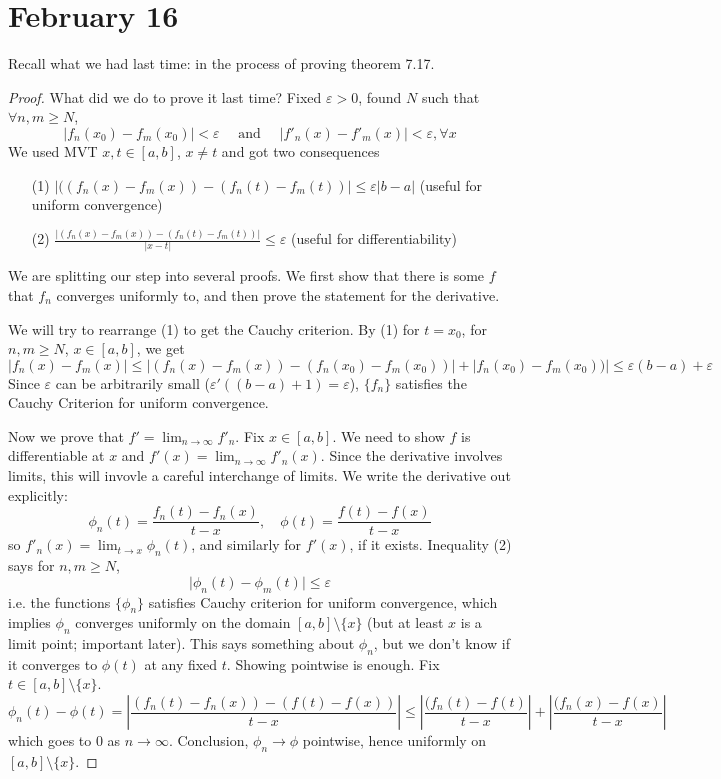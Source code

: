 \documentclass{article}
\theoremstyle{plain}
\theoremstyle{remark}
\newcommand{\ep}{{\varepsilon}}
\begin{document}
\section{February 16}
Recall what we had last time: in the process of proving theorem 7.17.
\begin{proof}
	What did we do to prove it last time?
	Fixed $\ep > 0$, found $N$ such that $\forall n,m \geq N$,
	\[
		\lvert f_n(x_0) - f_m(x_0) \rvert < \ep
		\quad\text{ and }\quad
		\lvert f'_n(x) - f'_m(x)\rvert < \ep, \forall x
	\]
	We used MVT $x,t \in [a,b]$, $x \neq t$ and got two consequences
	\begin{enumerate}
		\item[(1)] $|((f_n(x) - f_m(x)) - (f_n(t) - f_m(t)) | \leq \ep |b-a|$
			(useful for uniform convergence)
		\item[(2)] $\frac{|(f_n(x) - f_m(x)) - (f_n(t) - f_m(t))|}{|x-t|} \leq \ep$
			(useful for differentiability)
	\end{enumerate}

	We are splitting our step into several proofs.
	We first show that there is some $f$ that $f_n$ converges uniformly to,
	and then prove the statement for the derivative.

	We will try to rearrange (1) to get the Cauchy criterion.
	By (1) for $t = x_0$, for $n,m \geq N$, $x \in [a,b]$, we get
	\[
		\lvert f_n(x) - f_m(x) \rvert
		\leq \lvert (f_n(x) - f_m(x)) - (f_n(x_0) - f_m(x_0))\rvert
		+ \lvert f_n(x_0) - f_m(x_0)) \rvert 
		\leq \ep(b-a) + \ep
	\]
	Since $\ep$ can be arbitrarily small ($\ep'((b-a) + 1) = \ep$),
	$\{f_n\}$ satisfies the Cauchy Criterion for uniform convergence.
	
	Now we prove that $f' = \lim_{n\to\infty} f'_n$.
	Fix $x \in [a,b]$.
	We need to show $f$ is differentiable at $x$ and $f'(x) = \lim_{n\to\infty} f'_n(x)$.
	Since the derivative involves limits,
	this will invovle a careful interchange of limits.
	We write the derivative out explicitly:
	\[
		\phi_n(t) = \frac{f_n(t) - f_n(x)}{t-x}, \quad \phi(t) = \frac{f(t) - f(x)}{t-x}
	\]
	so $f'_n(x) = \lim_{t \to x}\phi_n(t)$, and similarly  for $f'(x)$, if it exists.
	Inequality (2) says for $n,m \geq N$,
	\[
		\lvert \phi_n(t) - \phi_m(t) \rvert \leq \ep
	\]
	i.e. the functions $\{\phi_n\}$ satisfies Cauchy criterion for uniform convergence,
	which implies $\phi_n$ converges uniformly on the domain $[a,b] \setminus\{x\}$
	(but at least $x$ is a limit point; important later).
	This says something about $\phi_n$, but we don't know
	if it converges to $\phi(t)$ at any fixed $t$.
	Showing pointwise is enough.
	Fix $t \in [a,b] \setminus \{x\}$.
	\[
		\phi_n(t) - \phi(t) =
		\left\lvert\frac{(f_n(t) - f_n(x)) - (f(t) - f(x))}{t-x}\right\rvert
		\leq \left\lvert \frac{(f_n(t) - f(t)}{t-x}\right\rvert
		+ \left\lvert \frac{(f_n(x) - f(x)}{t-x}\right\rvert
	\]
	which goes to $0$ as $n \to \infty$.
	Conclusion, $\phi_n \to \phi$ pointwise, hence uniformly on $[a,b] \setminus \{x\}$.


\end{proof}
\end{document}

